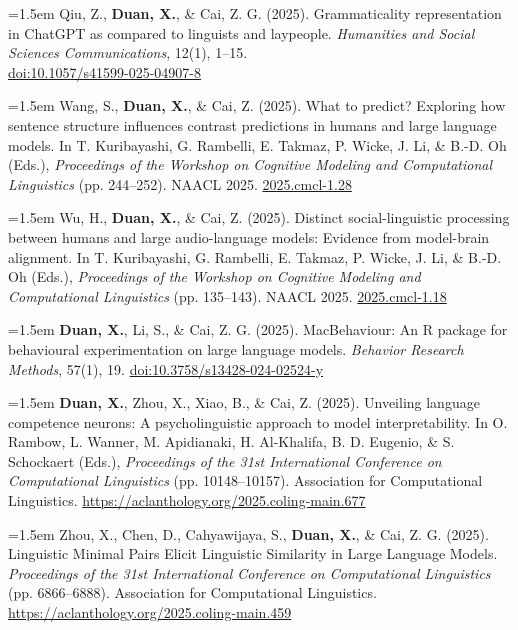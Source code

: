 \documentclass[11pt,a4paper]{article}
\begin{document}
\hangindent=1.5em  Qiu, Z., \textbf{Duan, X.}, \& Cai, Z. G. (2025). Grammaticality representation in ChatGPT as compared to linguists and laypeople. \textit{Humanities and Social Sciences Communications}, 12(1), 1–15. \\
\href{https://doi.org/10.1057/s41599-025-04907-8}{doi:10.1057/s41599-025-04907-8}

\hangindent=1.5em  Wang, S., \textbf{Duan, X.}, \& Cai, Z. (2025). What to predict? Exploring how sentence structure influences contrast predictions in humans and large language models. In T. Kuribayashi, G. Rambelli, E. Takmaz, P. Wicke, J. Li, \& B.-D. Oh (Eds.), \textit{Proceedings of the Workshop on Cognitive Modeling and Computational Linguistics} (pp. 244–252). NAACL 2025. \href{https://aclanthology.org/2025.cmcl-1.28/}{2025.cmcl-1.28}

\hangindent=1.5em  Wu, H., \textbf{Duan, X.}, \& Cai, Z. (2025). Distinct social-linguistic processing between humans and large audio-language models: Evidence from model-brain alignment. In T. Kuribayashi, G. Rambelli, E. Takmaz, P. Wicke, J. Li, \& B.-D. Oh (Eds.), \textit{Proceedings of the Workshop on Cognitive Modeling and Computational Linguistics} (pp. 135–143). NAACL 2025. \href{https://aclanthology.org/2025.cmcl-1.18/}{2025.cmcl-1.18}

\hangindent=1.5em  \textbf{Duan, X.}, Li, S., \& Cai, Z. G. (2025). MacBehaviour: An R package for behavioural experimentation on large language models. \textit{Behavior Research Methods}, 57(1), 19. \href{https://doi.org/10.3758/s13428-024-02524-y}{doi:10.3758/s13428-024-02524-y}

\hangindent=1.5em  \textbf{Duan, X.}, Zhou, X., Xiao, B., \& Cai, Z. (2025). Unveiling language competence neurons: A psycholinguistic approach to model interpretability. In O. Rambow, L. Wanner, M. Apidianaki, H. Al-Khalifa, B. D. Eugenio, \& S. Schockaert (Eds.), \textit{Proceedings of the 31st International Conference on Computational Linguistics} (pp. 10148–10157). Association for Computational Linguistics. \href{https://aclanthology.org/2025.coling-main.677/}{https://aclanthology.org/2025.coling-main.677}

\hangindent=1.5em  Zhou, X., Chen, D., Cahyawijaya, S., \textbf{Duan, X.}, \& Cai, Z. G. (2025). Linguistic Minimal Pairs Elicit Linguistic Similarity in Large Language Models. \textit{Proceedings of the 31st International Conference on Computational Linguistics} (pp. 6866–6888). Association for Computational Linguistics. \href{https://aclanthology.org/2025.coling-main.459/}{https://aclanthology.org/2025.coling-main.459}
\end{document}
